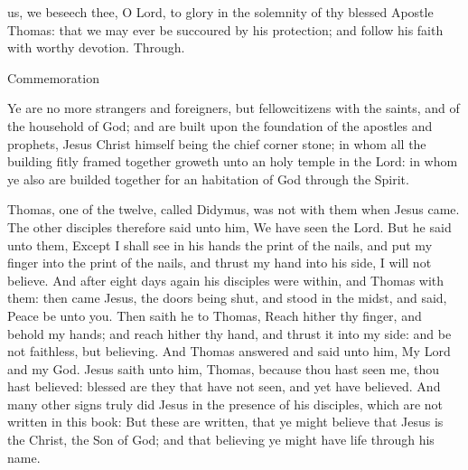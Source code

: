 \collect
{} us, we beseech thee, O Lord, to glory in the solemnity of thy blessed Apostle Thomas: that we may ever be succoured by his protection; and follow his faith with worthy devotion. Through.

\begin{rubric}
    Commemoration 
\end{rubric}

 Ye are no more strangers and foreigners, but fellowcitizens with the saints, and of the household of God; and are built upon the foundation of the apostles and prophets, Jesus Christ himself being the chief corner stone; in whom all the building fitly framed together groweth unto an holy temple in the Lord: in whom ye also are builded together for an habitation of God through the Spirit.


 Thomas, one of the twelve, called Didymus, was not with them when Jesus came. The other disciples therefore said unto him, We have seen the Lord. But he said unto them, Except I shall see in his hands the print of the nails, and put my finger into the print of the nails, and thrust my hand into his side, I will not believe. And after eight days again his disciples were within, and Thomas with them: then came Jesus, the doors being shut, and stood in the midst, and said, Peace be unto you. Then saith he to Thomas, Reach hither thy finger, and behold my hands; and reach hither thy hand, and thrust it into my side: and be not faithless, but believing. And Thomas answered and said unto him, My Lord and my God. Jesus saith unto him, Thomas, because thou hast seen me, thou hast believed: blessed are they that have not seen, and yet have believed. And many other signs truly did Jesus in the presence of his disciples, which are not written in this book: But these are written, that ye might believe that Jesus is the Christ, the Son of God; and that believing ye might have life through his name.


\vspace{-0.5\baselineskip}

